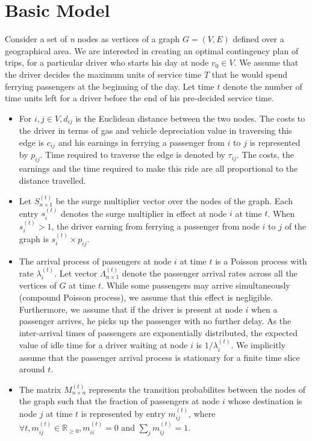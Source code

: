 
\section{Basic Model}

Consider a set of \emph{n} nodes as vertices of a graph $G=(V,E)$ defined over a geographical area. We are interested in creating an optimal contingency plan of trips, for a particular driver who starts his day at node $v_0 \in V$. We assume that the driver decides the maximum units of service time $T$ that he would spend ferrying passengers at the beginning of the day. Let time $t$ denote the number of time units left for a driver before the end of his pre-decided service time.
\begin{itemize}
\item For $i,j \in V, d_{ij}$ is the Euclidean distance between the two nodes. The costs to the driver in terms of gas and vehicle depreciation value in traversing this edge is $c_{ij}$ and his earnings in ferrying a passenger from $i$ to $j$ is represented by $p_{ij}$. Time required to traverse the edge is denoted by $\tau_{ij}$. The costs, the earnings and the time required to make this ride are all proportional to the distance travelled.

\item Let $S^{(t)}_{n \times 1}$ be the surge multiplier vector over the nodes of the graph. Each entry $s_i^{(t)}$ denotes the surge multiplier in effect at node $i$ at time $t$. When $s_i^{(t)} > 1$, the driver earning from ferrying a passenger from node $i$ to $j$ of the graph is $s_i^{(t)} \times p_{ij}$.

\item The arrival process of passengers at node $i$ at time $t$ is a Poisson process with rate $\lambda_i^{(t)}$. Let vector $\Lambda^{(t)}_{n \times 1}$ denote the passenger arrival rates across all the vertices of $G$ at time $t$. While some passengers may arrive simultaneously (compound Poisson process), we assume that this effect is negligible. Furthermore, we assume that if the driver is present at node $i$ when a passenger arrives, he picks up the passenger with no further delay. As the inter-arrival times of passengers are exponentially distributed, the expected value of idle time for a driver waiting at node $i$ is $1/\lambda_i^{(t)}$. We implicitly assume that the passenger arrival process is stationary for a finite time slice around $t$.

\item The matrix $M^{(t)}_{n \times n}$ represents the transition probabilites between the nodes of the graph such that the fraction of passengers at node $i$ whose destination is node $j$ at time $t$ is represented by entry $m_{ij}^{(t)}$, where $\forall t, m_{ij}^{(t)} \in \mathbb{R}_{\geq 0}, m_{ii}^{(t)}=0$ and $\sum\limits_{j}m_{ij}^{(t)}=1$.


\end{itemize}
